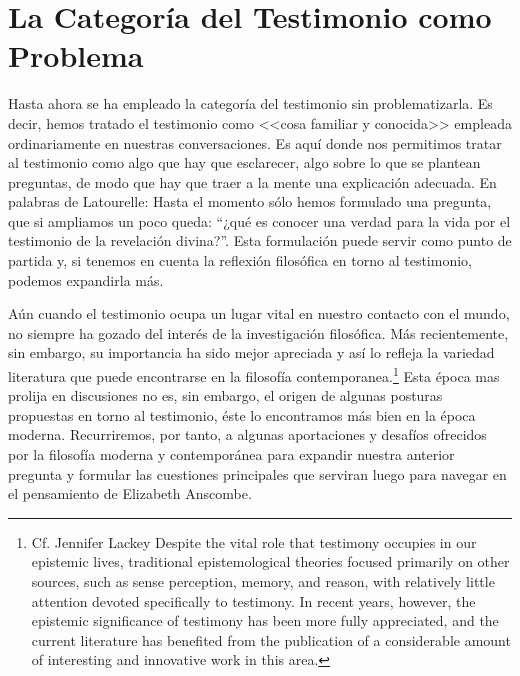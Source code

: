 \section{La Categoría del Testimonio como Problema}

Hasta ahora se ha empleado la categoría del testimonio sin problematizarla. Es
decir, hemos tratado el testimonio como <<cosa familiar y conocida>> empleada
ordinariamente en nuestras conversaciones. Es aquí donde nos permitimos tratar
al testimonio como algo que hay que esclarecer, algo sobre lo que se plantean
preguntas, de modo que hay que traer a la mente una explicación adecuada. En
palabras de Latourelle:
Hasta el momento sólo hemos formulado una pregunta, que si ampliamos un poco
queda: ``¿qué es conocer una verdad para la vida por el testimonio de la
revelación divina?''. Esta formulación puede servir como punto de partida y, si
tenemos en cuenta la reflexión filosófica en torno al testimonio, podemos
expandirla más.

Aún cuando el testimonio ocupa un lugar vital en nuestro contacto con el mundo,
no siempre ha gozado del interés de la investigación filosófica. Más
recientemente, sin embargo, su importancia ha sido mejor apreciada y así lo
refleja la variedad literatura que puede encontrarse en la filosofía
contemporanea.\footnote{Cf. Jennifer Lackey Despite the vital role that
  testimony occupies in our epistemic lives, traditional epistemological
  theories focused primarily on other sources, such as sense perception, memory,
  and reason, with relatively little attention devoted specifically to
  testimony. In recent years, however, the epistemic significance of testimony
  has been more fully appreciated, and the current literature has benefited from
  the publication of a considerable amount of interesting and innovative work in
  this area.}
Esta época mas prolija en discusiones no es, sin embargo, el origen de algunas
posturas propuestas en torno al testimonio, éste lo encontramos más bien en la
época moderna. Recurriremos, por tanto, a algunas aportaciones y desafíos
ofrecidos por la filosofía moderna y contemporánea para expandir nuestra
anterior pregunta y formular las cuestiones principales que serviran luego para
navegar en el pensamiento de Elizabeth Anscombe.

